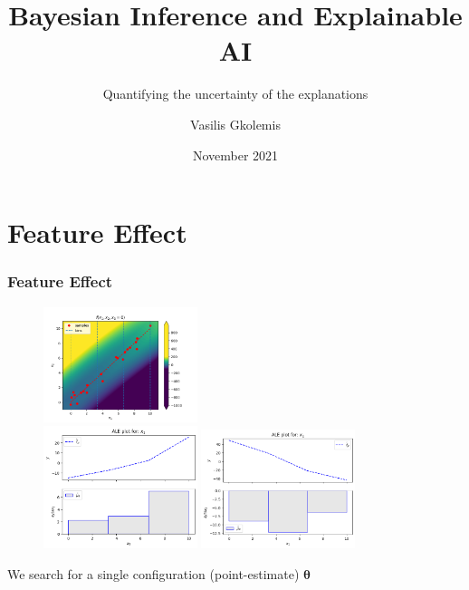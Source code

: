 \documentclass{beamer}
\title[FUB-Presentation]{Bayesian Inference and Explainable AI}
\subtitle{Quantifying the uncertainty of the explanations}
\author[Gkolemis, Vasilis] %
{Vasilis Gkolemis\inst{1}}
\institute[VFU] %
{
  \inst{1}%
  ATHENA Research and Innovation Center
}
\date{November 2021}
\newcommand{\thetab}{\boldsymbol{\theta}}
\begin{document}
\frame{\titlepage}


\section{Feature Effect}
\begin{frame}
  \frametitle{Feature Effect}

  \begin{figure}[ht]
    \centering
    \includegraphics[width=0.4\textwidth]{./figures/bin_splitting_3_bins.png}\\
    \includegraphics[width=0.4\textwidth]{./figures/dale_3_bins.png}
    \includegraphics[width=0.4\textwidth]{./figures/ale_3_bins.png}
    \label{}
  \end{figure}
  \noindent\makebox[\linewidth]{\rule{\paperwidth}{0.4pt}}
  We search for a \alert{single configuration (point-estimate) \( \hat{\thetab}\) }
\end{frame}



\end{document}
